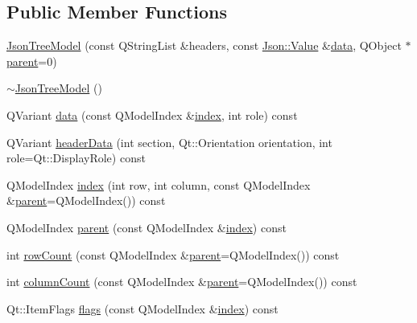 \subsection*{Public Member Functions}
\begin{DoxyCompactItemize}
\item 
\hyperlink{class_json_tree_model_ae578e41b3c06ef9ae969b0e7e43c8f98}{Json\+Tree\+Model} (const Q\+String\+List \&headers, const \hyperlink{class_json_1_1_value}{Json\+::\+Value} \&\hyperlink{class_json_tree_model_a6fb35b30bb69bc63a6faa6b123256ac5}{data}, Q\+Object $\ast$\hyperlink{class_json_tree_model_aea54120cdf66d49e8f0ad176eed8fc99}{parent}=0)
\item 
\hyperlink{class_json_tree_model_aa727dca0c93d6a6dd5ff01fad68b4d13}{$\sim$\+Json\+Tree\+Model} ()
\item 
Q\+Variant \hyperlink{class_json_tree_model_a6fb35b30bb69bc63a6faa6b123256ac5}{data} (const Q\+Model\+Index \&\hyperlink{class_json_tree_model_ac8be89cc178ef5151479be23006d18e3}{index}, int role) const
\item 
Q\+Variant \hyperlink{class_json_tree_model_ac7bebf8fa62b65a6bed96dba108c00a0}{header\+Data} (int section, Qt\+::\+Orientation orientation, int role=Qt\+::\+Display\+Role) const
\item 
Q\+Model\+Index \hyperlink{class_json_tree_model_ac8be89cc178ef5151479be23006d18e3}{index} (int row, int column, const Q\+Model\+Index \&\hyperlink{class_json_tree_model_aea54120cdf66d49e8f0ad176eed8fc99}{parent}=Q\+Model\+Index()) const
\item 
Q\+Model\+Index \hyperlink{class_json_tree_model_aea54120cdf66d49e8f0ad176eed8fc99}{parent} (const Q\+Model\+Index \&\hyperlink{class_json_tree_model_ac8be89cc178ef5151479be23006d18e3}{index}) const
\item 
int \hyperlink{class_json_tree_model_a7b9499f0aac83100742eaf4e0f160933}{row\+Count} (const Q\+Model\+Index \&\hyperlink{class_json_tree_model_aea54120cdf66d49e8f0ad176eed8fc99}{parent}=Q\+Model\+Index()) const
\item 
int \hyperlink{class_json_tree_model_a65c133944c24a5121f8a4f89775e18a6}{column\+Count} (const Q\+Model\+Index \&\hyperlink{class_json_tree_model_aea54120cdf66d49e8f0ad176eed8fc99}{parent}=Q\+Model\+Index()) const
\item 
Qt\+::\+Item\+Flags \hyperlink{class_json_tree_model_ab85e55867599e981b4e6697271998b0f}{flags} (const Q\+Model\+Index \&\hyperlink{class_json_tree_model_ac8be89cc178ef5151479be23006d18e3}{index}) const
\item 

\end{DoxyCompactItemize}
